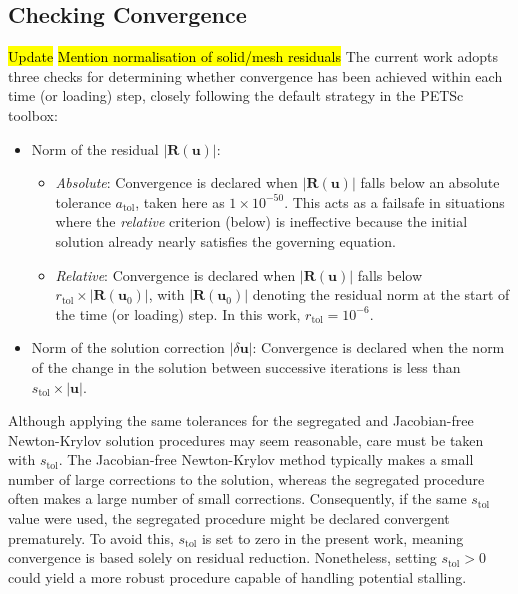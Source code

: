 \documentclass[sn-mathphys,Numbered]{sn-jnl}%
\newcommand{\bb}{\boldsymbol}
\begin{document}
\subsection{Checking Convergence}
\hl{Update}
\hl{Mention normalisation of solid/mesh residuals}
The current work adopts three checks for determining whether convergence has been achieved within each time (or loading) step, closely following the default strategy in the PETSc toolbox:
\begin{itemize}
    \item Norm of the residual $|\bb{R}(\bb{u})|$:
    \begin{itemize}
        \item \emph{Absolute}: Convergence is declared when $|\bb{R}(\bb{u})|$ falls below an absolute tolerance $a_{\text{tol}}$, taken here as $1\times 10^{-50}$. This acts as a failsafe in situations where the \emph{relative} criterion (below) is ineffective because the initial solution already nearly satisfies the governing equation.
        \item \emph{Relative}: Convergence is declared when $|\bb{R}(\bb{u})|$ falls below $r_{\text{tol}} \times |\bb{R}(\bb{u}_0)|$, with $|\bb{R}(\bb{u}_0)|$ denoting the residual norm at the start of the time (or loading) step. In this work, $r_{\text{tol}} = 10^{-6}$.
    \end{itemize}
    \item Norm of the solution correction $|\delta \bb{u}|$: Convergence is declared when the norm of the change in the solution between successive iterations is less than $s_{\text{tol}} \times |\bb{u}|$.
\end{itemize}

Although applying the same tolerances for the segregated and Jacobian-free Newton-Krylov solution procedures may seem reasonable, care must be taken with $s_{\text{tol}}$. The Jacobian-free Newton-Krylov method typically makes a small number of large corrections to the solution, whereas the segregated procedure often makes a large number of small corrections. Consequently, if the same $s_{\text{tol}}$ value were used, the segregated procedure might be declared convergent prematurely. To avoid this, $s_{\text{tol}}$ is set to zero in the present work, meaning convergence is based solely on residual reduction. Nonetheless, setting $s_{\text{tol}} > 0$ could yield a more robust procedure capable of handling potential stalling.
\end{document}
